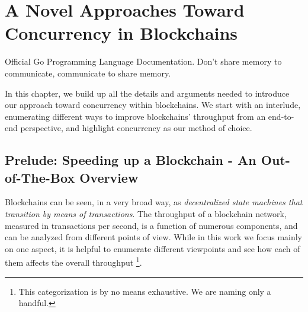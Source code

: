 \chapter{A Novel Approaches Toward Concurrency in Blockchains} \label{chap:approach}

\begin{chapquote}{Official Go Programming Language Documentation.}
    Don't share memory to communicate, communicate to share memory.
\end{chapquote}

In this chapter, we build up all the details and arguments needed to introduce our approach toward
concurrency within blockchains. We start with an interlude, enumerating different ways to improve
blockchains' throughput from an end-to-end perspective, and highlight concurrency as our method of
choice.

\section{Prelude: Speeding up a Blockchain - An Out-of-The-Box Overview}
\label{chap_approach:sec:ways_to_speedup}

Blockchains can be seen, in a very broad way, as \textit{decentralized state machines that
transition by means of transactions}. The throughput of a blockchain network, measured in
transactions per second, is a function of numerous components, and can be analyzed from different
points of view. While in this work we focus mainly on one aspect, it is helpful to enumerate
different viewpoints and see how each of them affects the overall throughput \footnote{This
categorization is by no means exhaustive. We are naming only a handful.}.

